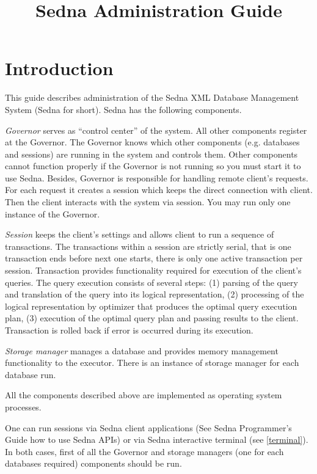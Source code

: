 \documentclass[a4paper,12pt]{article}
\title{Sedna Administration Guide}
\date{}
\newcommand{\TocAt}[6]{}
\begin{document}
\sloppy
\maketitle

\TocAt*{section,subsection,subsubsection}
\TocAt*{subsection,subsubsection}

\tableofcontents

\newpage

\section{Introduction}
This guide describes administration of the Sedna XML Database Management System (Sedna for short). Sedna has the following components.

\emph{Governor} serves as  ``control center'' of the system. All other components register at the Governor. The Governor knows which other components (e.g. databases and sessions) are running in the system and controls them. Other components cannot function properly if the Governor is not running so you must start it to use Sedna. Besides, Governor is responsible for handling remote client's requests. For each request it creates a session which keeps the direct connection with client. Then the client interacts with the system via session. You may run only one instance of the Governor.


\emph{Session} keeps the client's settings and allows client to run a sequence of transactions. The transactions within a session are strictly serial, that is one transaction ends before next one starts, there is only one active transaction per session. Transaction provides functionality required for execution of the client's queries. The query execution consists of several steps: (1) parsing of the query and translation of the query into its logical representation, (2) processing of the logical representation by optimizer that produces the optimal query execution plan, (3) execution of the optimal query plan and passing results to the client. Transaction is rolled back if error is occurred during its execution.

\emph{Storage manager} manages a database and provides memory management functionality to the executor. There is an instance of storage manager for each database run.

All the components described above are implemented as operating system processes.


One can run sessions via Sedna client applications (See Sedna Programmer's Guide how to use Sedna APIs) or via Sedna interactive terminal (see \ref{terminal}). In both cases, first of all the Governor and storage managers (one for each databases required) components should be run.
\end{document}
